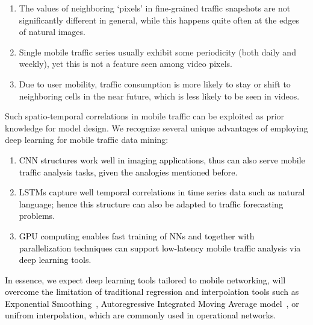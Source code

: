 \documentclass[journal,comsoc,letter]{IEEEtran}
\newcommand{\edit}[1]{\textcolor{black}{#1}}
\begin{document}
\begin{enumerate}
\item The values of neighboring `pixels' in fine-grained traffic snapshots are not significantly different in general, while this happens quite often at the edges of natural images.
\item Single mobile traffic series usually exhibit some periodicity (both daily and weekly), yet this is not a feature seen among video pixels.
\item Due to user mobility, traffic consumption is more likely to stay or shift to neighboring cells in the near future, which is less likely to be seen in videos.
\end{enumerate}
Such spatio-temporal correlations in mobile traffic can be exploited as prior knowledge for model design. We recognize several unique advantages of employing deep learning for mobile traffic data mining:
\edit{
\begin{enumerate}
\item CNN structures work well in imaging applications, thus can also serve mobile traffic analysis tasks, given the analogies mentioned before.
\item LSTMs capture well temporal correlations in time series data such as natural language; hence this structure can also be adapted to traffic forecasting problems. 
\item GPU computing enables fast training of NNs and together with parallelization techniques can support low-latency mobile traffic analysis via deep learning tools.
\end{enumerate}
In essence, we expect deep learning tools tailored to mobile networking, will overcome the limitation of traditional regression and interpolation tools such as Exponential Smoothing~\cite{tikunov2007traffic}, Autoregressive Integrated Moving Average model~\cite{Kim2011}, or unifrom interpolation, which are commonly used in operational networks.}
\end{document}
